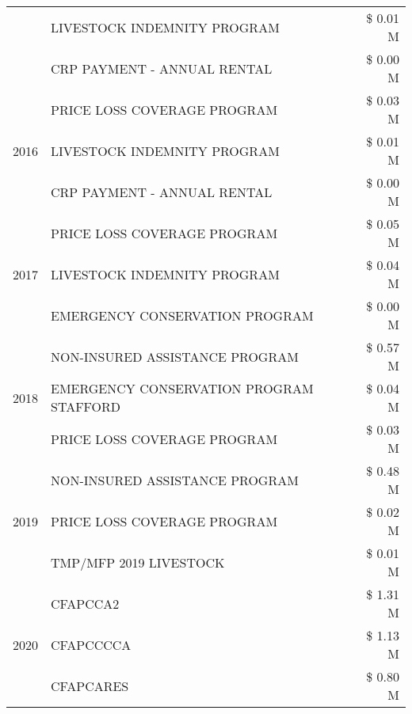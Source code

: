 \begin{tabular}{llr}
 & LIVESTOCK INDEMNITY PROGRAM & \$ 0.01 M \\
 & CRP PAYMENT - ANNUAL RENTAL & \$ 0.00 M \\
\cline{1-3}
\multirow[t]{3}{*}{2016} & PRICE LOSS COVERAGE PROGRAM                   & \$ 0.03 M \\
 & LIVESTOCK INDEMNITY PROGRAM                   & \$ 0.01 M \\
 & CRP PAYMENT - ANNUAL RENTAL                   & \$ 0.00 M \\
\cline{1-3}
\multirow[t]{3}{*}{2017} & PRICE LOSS COVERAGE PROGRAM & \$ 0.05 M \\
 & LIVESTOCK INDEMNITY PROGRAM & \$ 0.04 M \\
 & EMERGENCY CONSERVATION PROGRAM & \$ 0.00 M \\
\cline{1-3}
\multirow[t]{3}{*}{2018} & NON-INSURED ASSISTANCE PROGRAM & \$ 0.57 M \\
 & EMERGENCY CONSERVATION PROGRAM STAFFORD & \$ 0.04 M \\
 & PRICE LOSS COVERAGE PROGRAM & \$ 0.03 M \\
\cline{1-3}
\multirow[t]{3}{*}{2019} & NON-INSURED ASSISTANCE PROGRAM & \$ 0.48 M \\
 & PRICE LOSS COVERAGE PROGRAM & \$ 0.02 M \\
 & TMP/MFP 2019 LIVESTOCK & \$ 0.01 M \\
\cline{1-3}
\multirow[t]{3}{*}{2020} & CFAPCCA2 & \$ 1.31 M \\
 & CFAPCCCCA & \$ 1.13 M \\
 & CFAPCARES & \$ 0.80 M \\
\cline{1-3}
\bottomrule
\end{tabular}
